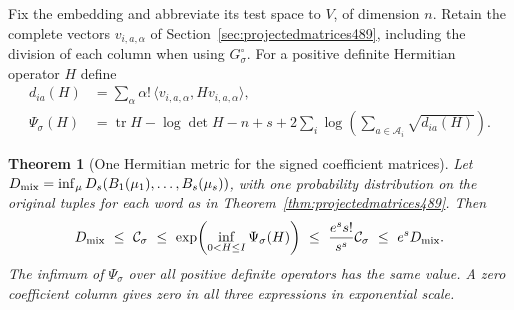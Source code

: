 \documentclass[a4paper,11pt]{article}
\newtheorem{theorem}[proposition]{Theorem}
\theoremstyle{definition}
\theoremstyle{remark}
\numberwithin{equation}{section}
\begin{document}
Fix the embedding and abbreviate its test space to \(V\), of
dimension \(n\). Retain the complete vectors \(v_{i,a,\alpha}\)
of Section~\ref{sec:projectedmatrices489}, including the division
of each column when using \(G^\circ_\sigma\). For a positive
definite Hermitian operator \(H\) define
\[
 \begin{aligned}
 d_{ia}(H)&=\sum_\alpha\alpha!\,
                     \langle v_{i,a,\alpha},Hv_{i,a,\alpha}\rangle,\\
 \Psi_\sigma(H)&=\operatorname{tr}H-\log\det H-n+s
             +2\sum_i\log\!\left(\sum_{a\in\mathcal A_i}
                                             \sqrt{d_{ia}(H)}\right).
 \end{aligned}
\]

\begin{theorem}[One Hermitian metric for the signed coefficient matrices]\leavevmode
\label{thm:dualmetric491}
Let \(D_{\rm mix}=\inf_\mu D_s(B_1(\mu_1),\ldots,B_s(\mu_s))\),
with one probability distribution on the original tuples for
each word as in Theorem~\ref{thm:projectedmatrices489}. Then
\[
 \begin{gathered}
 D_{\rm mix}\ \le\ \mathcal C_\sigma
   \ \le\ \exp\!\left(\inf_{0<H\le I}\Psi_\sigma(H)\right)
   \ \le\ {e^s s!\over s^s}\mathcal C_\sigma\ \le\ e^sD_{\rm mix} .
 \end{gathered}
\]
The infimum of \(\Psi_\sigma\) over all positive definite
operators has the same value. A zero coefficient column gives
zero in all three expressions in exponential scale.
\end{theorem}
\end{document}
